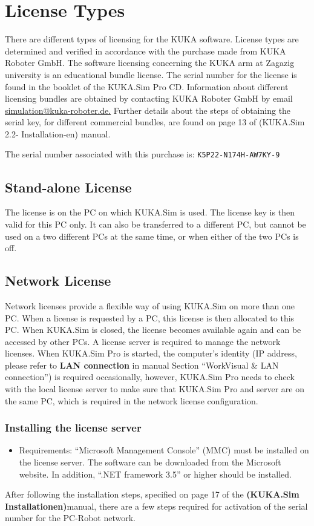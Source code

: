 \section{License Types}
There are different types of licensing for the KUKA software. License types are determined and verified in accordance with the purchase made from KUKA Roboter GmbH. 
The software licensing concerning the KUKA arm at Zagazig university is an educational bundle license. The serial number for the license is found in the booklet of the KUKA.Sim Pro CD. Information about different licensing bundles are obtained by contacting KUKA Roboter GmbH by email
\url{simulation@kuka-roboter.de.}
Further details about the steps of obtaining the serial key, for different commercial bundles,  are found on page 13 of (KUKA.Sim 2.2- Installation-en) manual.
\begin{mytheo}
 The serial number associated with this purchase is: \texttt {K5P22-N174H-AW7KY-9}
\end{mytheo}

\subsection{Stand-alone License}
The license is on the PC on which KUKA.Sim is used. The license key is then valid for this PC only. It can also be transferred to a different PC, but cannot be used on a two different PCs at the same time, or when either of the two PCs is off.

\subsection{Network License}
Network licenses provide a flexible way of using KUKA.Sim on more than one PC. When a license is requested by a PC, this license is then allocated to this PC. When KUKA.Sim is closed, the license becomes available again and can be accessed by other PCs. 
A license server is required to manage the network licenses. When KUKA.Sim Pro is started, the computer’s identity (IP address, please refer to \textbf {LAN connection} in manual Section “WorkVisual \& LAN connection”) is required occasionally, however, KUKA.Sim Pro needs to check with the local license server to make sure that KUKA.Sim Pro and server are on the same PC, which is required in the network license configuration.

\subsubsection{Installing the license server}
\begin{itemize}
\item Requirements:
“Microsoft Management Console” (MMC) must be installed on the license server. The software can be downloaded from the Microsoft website. In addition, “.NET framework 3.5” or higher should be installed. 
\end{itemize}
After following the installation steps, specified on page 17 of the \textbf {(KUKA.Sim
\textunderscore Installation\textunderscore en)}manual, there are a few steps required for activation of the serial number for the PC-Robot network.

